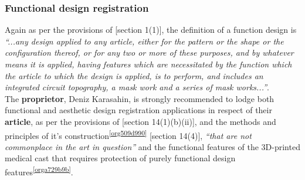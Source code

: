 \documentclass[11pt]{article}
\begin{document}
\subsubsection{Functional design registration}
\label{sec:org69c07e9}
Again as per the provisions of [section 1(1)]\cite{rsa93_designs_act}, the
definition of a function design is \textit{``...any design applied to
any article, either for the pattern or the shape or the configuration thereof,
or for any two or more of these purposes, and by whatever means it is applied,
having features which are necessitated by the function which the article to
which the design is applied, is to perform, and includes an integrated circuit
topography, a mask work and a series of mask works...''}.\\

The \textbf{proprietor}, Deniz Karasahin, is strongly recommended to lodge both
functional and aesthetic design registration applications in respect of their
\textbf{article}, as per the provisions of [section
14(1)(b)(ii)]\cite{rsa93_designs_act}, and the methods and principles of it's
construction\textsuperscript{\ref{org509d990}} [section 14(4)]\cite{rsa93_designs_act}, \emph{``that are not
commonplace in the art in question''} and the functional features of the
3D-printed medical cast that requires protection of purely functional design
features\textsuperscript{\ref{orga729b9b}}.

\printbibliography
\end{document}
